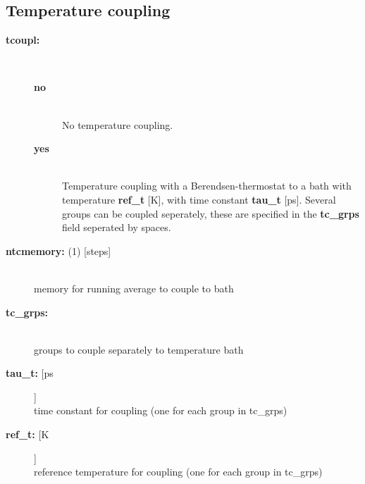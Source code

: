 \subsection{ Temperature coupling}
\begin{description}
\item[{\bf tcoupl:}]\mbox{}\\
\vspace{-2ex}\begin{description}
\item[{\bf no}]\mbox{}\\
No temperature coupling. 
\item[{\bf yes}]\mbox{}\\
Temperature coupling with a Berendsen-thermostat to a bath with
temperature {\bf ref\_t} [K], with time constant {\bf tau\_t} [ps].
Several groups can be coupled seperately, these are specified in the
{\bf tc\_grps} field seperated by spaces.
\end{description}
\item[{\bf ntcmemory: }(1) {[steps]}]\mbox{}\\
memory for running average to couple to bath
\item[{\bf tc\_grps:}]\mbox{}\\
groups to couple separately to temperature bath
\item[{\bf tau\_t: }[ps]]\mbox{}\\
time constant for coupling (one for each group in tc\_grps)
\item[{\bf ref\_t: }[K]]\mbox{}\\
reference temperature for coupling (one for each group in tc\_grps)
\end{description}


